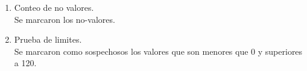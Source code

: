 \documentclass[11pt]{article}
\begin{document}


\begin{enumerate}
\item Conteo de no valores.\\
Se marcaron los no-valores.
\item Prueba de limites.\\
Se marcaron como sospechosos los valores que son menores que 0 y superiores a 120.

\end{enumerate}


\begin{table}[H]
\begin{center}



\end{center}
\end{table}
\end{document}
